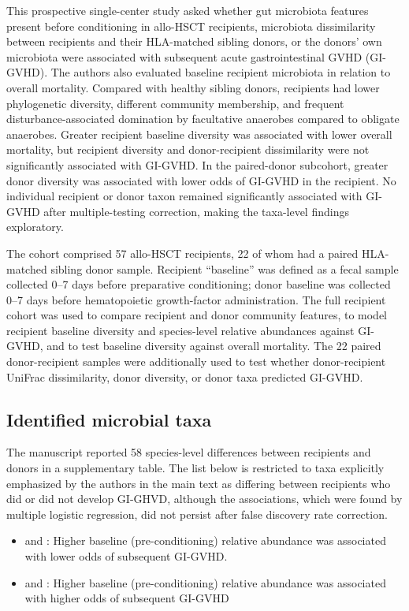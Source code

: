 \documentclass[11pt,a4paper]{article}
\begin{document}
This prospective single-center study asked whether gut microbiota features present before conditioning in allo-HSCT recipients, microbiota dissimilarity between recipients and their HLA-matched sibling donors, or the donors' own microbiota were associated with subsequent acute gastrointestinal GVHD (GI-GVHD). The authors also evaluated baseline recipient microbiota in relation to overall mortality. Compared with healthy sibling donors, recipients had lower phylogenetic diversity, different community membership, and frequent disturbance-associated domination by facultative anaerobes compared to obligate anaerobes. Greater recipient baseline diversity was associated with lower overall mortality, but recipient diversity and donor-recipient dissimilarity were not significantly associated with GI-GVHD. In the paired-donor subcohort, greater donor diversity was associated with lower odds of GI-GVHD in the recipient. No individual recipient or donor taxon remained significantly associated with GI-GVHD after multiple-testing correction, making the taxa-level findings exploratory.
\par

The cohort comprised 57 allo-HSCT recipients, 22 of whom had a paired HLA-matched sibling donor sample. Recipient ``baseline'' was defined as a fecal sample collected 0--7 days before preparative conditioning; donor baseline was collected 0--7 days before hematopoietic growth-factor administration. The full recipient cohort was used to compare recipient and donor community features, to model recipient baseline diversity and species-level relative abundances against GI-GVHD, and to test baseline diversity against overall mortality. The 22 paired donor-recipient samples were additionally used to test whether donor-recipient UniFrac dissimilarity, donor diversity, or donor taxa predicted GI-GVHD.
\par


\subsection{Identified microbial taxa}

The manuscript reported 58 species-level differences between recipients and donors in a supplementary table. The list below is restricted to taxa explicitly emphasized by the authors in the main text as differing between recipients who did or did not develop GI-GHVD, although the associations, which were found by multiple logistic regression, did not persist after false discovery rate correction. 
\begin{itemize}
\item \taxParabacteroidesDistasonis and \taxBarnesiellaceaeSpp: Higher baseline (pre-conditioning) relative abundance was associated with lower odds of subsequent GI-GVHD.
\item \taxLachnobacteriumSpp and \taxHaemophilusParainfluenzae: Higher baseline (pre-conditioning) relative abundance was associated with higher odds of subsequent GI-GVHD 

\end{itemize}
\end{document}
